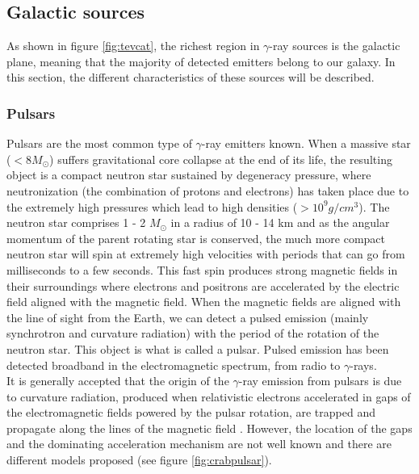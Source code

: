 \documentclass[main.tex]{subfiles}
\begin{document}
\subsection{Galactic sources}

As shown in figure \ref{fig:tevcat}, the richest region in $\gamma$-ray sources is the galactic plane, meaning that the majority of detected emitters belong to our galaxy. In this section, the different characteristics of these sources will be described. 

\subsubsection{Pulsars} \label{sec:pulsars}

Pulsars are the most common type of $\gamma$-ray emitters known. When a massive star ($< 8 M_{\odot}$) suffers gravitational core collapse at the end of its life, the resulting object is a compact neutron star sustained by degeneracy pressure, where neutronization (the combination of protons and electrons) has taken place due to the extremely high pressures which lead to high densities ($> 10^{9}g/cm^{3}$). The neutron star comprises 1 - 2 $M_{\odot}$ in a radius of 10 - 14 km and as the angular momentum of the parent rotating star is conserved, the much more compact neutron star will spin at extremely high velocities with periods that can go from milliseconds to a few seconds. This fast spin produces strong magnetic fields in their surroundings where electrons and positrons are accelerated by the electric field aligned with the magnetic field. When the magnetic fields are aligned with the line of sight from the Earth, we can detect a pulsed emission (mainly synchrotron and curvature radiation) with the period of the rotation of the neutron star. This object is what is called a pulsar. Pulsed emission has been detected broadband in the electromagnetic spectrum, from radio to $\gamma$-rays.\\ 
It is generally accepted that the origin of the $\gamma$-ray emission from pulsars is due to curvature radiation, produced when relativistic electrons accelerated in gaps of the electromagnetic fields powered by the pulsar rotation, are trapped and propagate along the lines of the magnetic field \cite{2008crabmagic}. However, the location of the gaps and the dominating acceleration mechanism are not well known and there are different models proposed (see figure \ref{fig:crabpulsar}).
\end{document}
